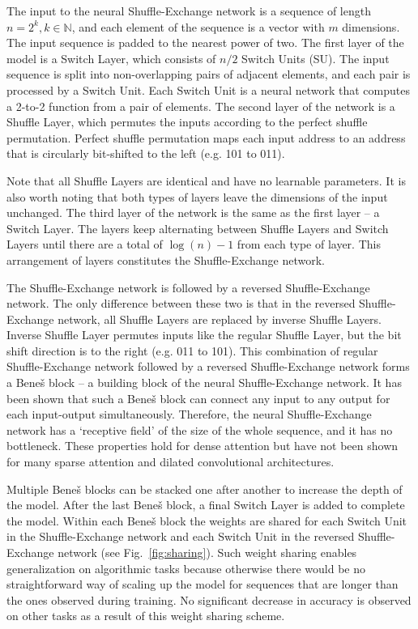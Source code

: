 \documentclass[letterpaper]{article} %
\begin{document}
The input to the neural Shuffle-Exchange network is a sequence of length $n=2^k, k \in \mathbb{N}$, and each element of the sequence is a vector with $m$ dimensions. The input sequence is padded to the nearest power of two. The first layer of the model is a Switch Layer, which consists of $n/2$ Switch Units (SU). The input sequence is split into non-overlapping pairs of adjacent elements, and each pair is processed by a Switch Unit. Each Switch Unit is a neural network that computes a 2-to-2 function from a pair of elements. The second layer of the network is a Shuffle Layer, which permutes the inputs according to the perfect shuffle permutation. Perfect shuffle permutation maps each input address to an address that is circularly bit-shifted to the left (e.g. 101 to 011).

Note that all Shuffle Layers are identical and have no learnable parameters. It is also worth noting that both types of layers leave the dimensions of the input unchanged. The third layer of the network is the same as the first layer -- a Switch Layer. The layers keep alternating between Shuffle Layers and Switch Layers until there are a total of $\log(n)-1$ from each type of layer. This arrangement of layers constitutes the Shuffle-Exchange network.

The Shuffle-Exchange network is followed by a reversed Shuffle-Exchange network. The only difference between these two is that in the reversed Shuffle-Exchange network, all Shuffle Layers are replaced by inverse Shuffle Layers. Inverse Shuffle Layer permutes inputs like the regular Shuffle Layer, but the bit shift direction is to the right (e.g. 011 to 101). This combination of regular Shuffle-Exchange network followed by a reversed Shuffle-Exchange network forms a Bene\v{s} block -- a building block of the neural Shuffle-Exchange network. It has been shown \citep{dally2004principles} that such a Bene\v{s} block can connect any input to any output for each input-output simultaneously. Therefore, the neural Shuffle-Exchange network has a `receptive field' of the size of the whole sequence, and it has no bottleneck. These properties hold for dense attention but have not been shown for many sparse attention and dilated convolutional architectures. 

Multiple Bene\v{s} blocks can be stacked one after another to increase the depth of the model. After the last Bene\v{s} block, a final Switch Layer is added to complete the model. Within each Bene\v{s} block the weights are shared for each Switch Unit in the Shuffle-Exchange network and each Switch Unit in the reversed Shuffle-Exchange network (see Fig.~\ref{fig:sharing}). Such weight sharing enables generalization on algorithmic tasks because otherwise there would be no straightforward way of scaling up the model for sequences that are longer than the ones observed during training. No significant decrease in accuracy is observed on other tasks as a result of this weight sharing scheme.
\end{document}
